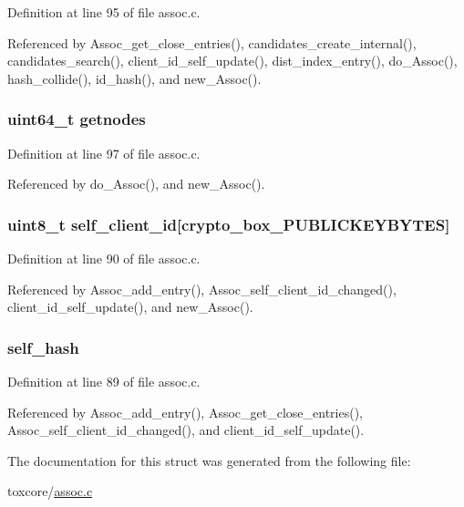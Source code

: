 Definition at line 95 of file assoc.\+c.



Referenced by Assoc\+\_\+get\+\_\+close\+\_\+entries(), candidates\+\_\+create\+\_\+internal(), candidates\+\_\+search(), client\+\_\+id\+\_\+self\+\_\+update(), dist\+\_\+index\+\_\+entry(), do\+\_\+\+Assoc(), hash\+\_\+collide(), id\+\_\+hash(), and new\+\_\+\+Assoc().

\hypertarget{struct_assoc_aec732782691c39a31d8c579a79a8fed2}{
\subsubsection[{getnodes}]{\setlength{\rightskip}{0pt plus 5cm}uint64\+\_\+t getnodes}}\label{struct_assoc_aec732782691c39a31d8c579a79a8fed2}


Definition at line 97 of file assoc.\+c.



Referenced by do\+\_\+\+Assoc(), and new\+\_\+\+Assoc().

\hypertarget{struct_assoc_a59ef97a1dbf10c89fb43f6fff2e65b39}{
\subsubsection[{self\+\_\+client\+\_\+id}]{\setlength{\rightskip}{0pt plus 5cm}uint8\+\_\+t self\+\_\+client\+\_\+id\mbox{[}crypto\+\_\+box\+\_\+\+P\+U\+B\+L\+I\+C\+K\+E\+Y\+B\+Y\+T\+E\+S\mbox{]}}}\label{struct_assoc_a59ef97a1dbf10c89fb43f6fff2e65b39}


Definition at line 90 of file assoc.\+c.



Referenced by Assoc\+\_\+add\+\_\+entry(), Assoc\+\_\+self\+\_\+client\+\_\+id\+\_\+changed(), client\+\_\+id\+\_\+self\+\_\+update(), and new\+\_\+\+Assoc().

\hypertarget{struct_assoc_a6531d0c8e69576ae8c58a02914abaefe}{
\subsubsection[{self\+\_\+hash}]{ self\+\_\+hash}}\label{struct_assoc_a6531d0c8e69576ae8c58a02914abaefe}


Definition at line 89 of file assoc.\+c.



Referenced by Assoc\+\_\+add\+\_\+entry(), Assoc\+\_\+get\+\_\+close\+\_\+entries(), Assoc\+\_\+self\+\_\+client\+\_\+id\+\_\+changed(), and client\+\_\+id\+\_\+self\+\_\+update().



The documentation for this struct was generated from the following file\+:\begin{DoxyCompactItemize}
\item 
toxcore/\hyperlink{assoc_8c}{assoc.\+c}\end{DoxyCompactItemize}
